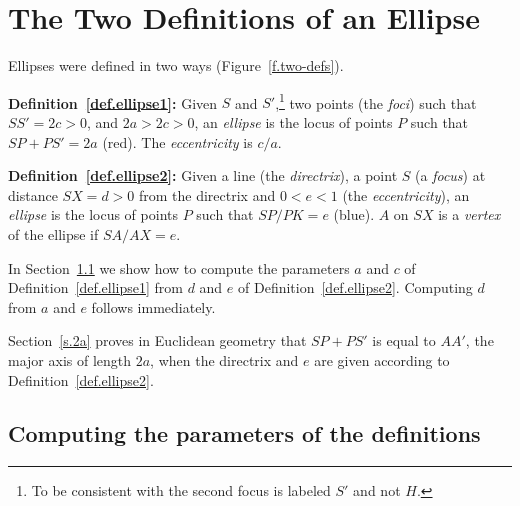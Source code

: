 
\chapter{The Two Definitions of an Ellipse}\label{s.two-defs}

Ellipses were defined in two ways (Figure~\ref{f.two-defs}).

\textbf{Definition~\ref{def.ellipse1}:} 
Given $S$ and $S'$,\footnote{To be consistent with \cite{besant} the second focus is labeled $S'$ and not $H$.} two points (the \emph{foci}) such that $SS'=2c>0$, and $2a>2c>0$, an \emph{ellipse} is the locus of points $P$ such that $SP+PS'=2a$ (red). The \emph{eccentricity} is $c/a$.

\textbf{Definition~\ref{def.ellipse2}:} 
Given a line (the \emph{directrix}), a point $S$ (a \emph{focus}) at distance $SX=d>0$ from the directrix and $0<e<1$ (the \emph{eccentricity}), an \emph{ellipse} is the locus of points $P$ such that $SP/PK=e$ (blue). $A$ on $SX$ is a \emph{vertex} of the ellipse if $SA/AX=e$.

In Section~\ref{s.parameters} we show how to compute the parameters $a$ and $c$ of Definition~\ref{def.ellipse1} from $d$ and $e$ of Definition~\ref{def.ellipse2}. Computing $d$ from $a$ and $e$ follows immediately.

Section~\ref{s.2a} proves in Euclidean geometry that $SP+PS'$ is equal to $AA'$, the major axis of length $2a$, when the directrix and $e$ are given according to Definition~\ref{def.ellipse2}. 

\section{Computing the parameters of the definitions}\label{s.parameters}


